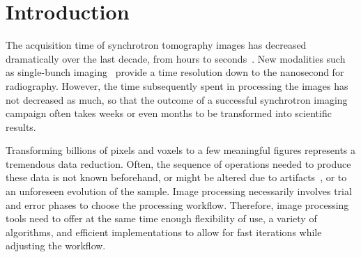 \documentclass[twocolumn]{bmcart}%
\begin{document}


\section*{Introduction}

The acquisition time of synchrotron tomography images has decreased
dramatically over the last decade, from hours to
seconds~\citep{Maire2014}. New modalities such as single-bunch
imaging~\citep{Rack2014} provide a time resolution down to the nanosecond
for radiography. However, the time subsequently spent in processing the
images has not decreased as much, so that the outcome of a successful
synchrotron imaging campaign often takes weeks or even months to be
transformed into scientific results. 

Transforming billions of pixels and voxels to a few meaningful figures
represents a tremendous data reduction. Often, the sequence of operations
needed to produce these data is not known beforehand, or might be altered
due to artifacts~\citep{Marone2010}, or to an unforeseen evolution of
the sample. Image processing necessarily involves trial and error phases
to choose the processing workflow. Therefore, image processing tools need
to offer at the same time enough flexibility of use, a variety of
algorithms, and efficient implementations to allow for fast iterations
while adjusting the workflow.
\end{document}
